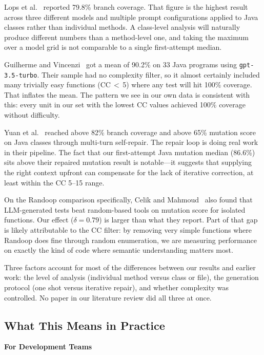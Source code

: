 Lops et al.~\cite{lops2025agonetest} reported 79.8\% branch coverage. That figure is the highest result across three different models and multiple prompt configurations applied to Java classes rather than individual methods. A class-level analysis will naturally produce different numbers than a method-level one, and taking the maximum over a model grid is not comparable to a single first-attempt median.

Guilherme and Vincenzi~\cite{guilherme2023sast} got a mean of 90.2\% on 33 Java programs using \texttt{gpt-3.5-turbo}. Their sample had no complexity filter, so it almost certainly included many trivially easy functions (CC\,$<$\,5) where any test will hit 100\% coverage. That inflates the mean. The pattern we see in our own data is consistent with this: every unit in our set with the lowest CC values achieved 100\% coverage without difficulty.

Yuan et al.~\cite{yuan2024chattester} reached above 82\% branch coverage and above 65\% mutation score on Java classes through multi-turn self-repair. The repair loop is doing real work in their pipeline. The fact that our first-attempt Java mutation median (86.6\%) sits above their repaired mutation result is notable---it suggests that supplying the right context upfront can compensate for the lack of iterative correction, at least within the CC 5--15 range.

On the Randoop comparison specifically, Celik and Mahmoud~\cite{celik2026gem} also found that LLM-generated tests beat random-based tools on mutation score for isolated functions. Our effect ($\delta = 0.79$) is larger than what they report. Part of that gap is likely attributable to the CC filter: by removing very simple functions where Randoop does fine through random enumeration, we are measuring performance on exactly the kind of code where semantic understanding matters most.

Three factors account for most of the differences between our results and earlier work: the level of analysis (individual method versus class or file), the generation protocol (one shot versus iterative repair), and whether complexity was controlled. No paper in our literature review did all three at once.

\subsection{What This Means in Practice}
\label{sec:disc-implications}

\textbf{For Development Teams}

